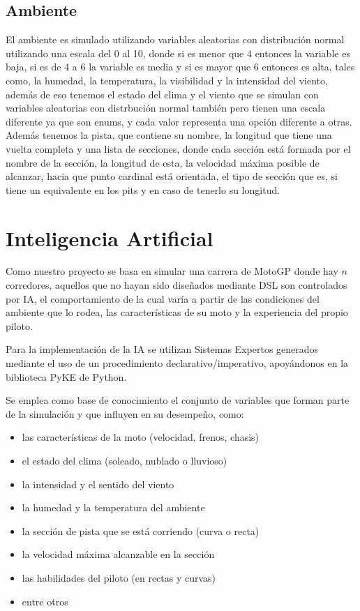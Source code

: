 \documentclass[12pt, letterpaper,spanish]{article}
\theoremstyle{definition}
\theoremstyle{remark}
\begin{document}
	\subsection{Ambiente}
		El ambiente es simulado utilizando variables aleatorias con distribución normal utilizando una escala del 0 al 10, donde si es menor que 4 entonces la variable es baja, si es de 4 a 6 la variable es media y si es mayor que 6 entonces es alta, tales como, la humedad, la temperatura, la visibilidad y la intensidad del viento, además de eso tenemos el estado del clima y el viento que se simulan con variables aleatorias con distrbución normal también pero tienen una escala diferente ya que son enums, y cada valor representa una  opción diferente a otras. Además tenemos la pista, que contiene su nombre, la longitud que tiene una vuelta completa y una lista de secciones, donde cada sección está formada por el nombre de la sección, la longitud de esta, la velocidad máxima posible de alcanzar, hacia que punto cardinal está orientada, el tipo de sección que es, si tiene un equivalente en los pits y en caso de tenerlo su longitud.  

\section{Inteligencia Artificial}\cite{conferenciasIA}\cite{russell}
	Como nuestro proyecto se basa en simular una carrera de MotoGP donde hay $n$ corredores, aquellos que no hayan sido diseñados mediante DSL son controlados por IA, el comportamiento de la cual varía a partir de las condiciones del ambiente que lo rodea, las características de su moto y la experiencia del propio piloto.
	
	Para la implementación de la IA se utilizan Sistemas Expertos generados mediante el uso de un procedimiento declarativo/imperativo, apoyándonos en la biblioteca PyKE\cite{pyke} de Python.
	
	Se emplea como base de conocimiento el conjunto de variables que forman parte de la simulación y que influyen en su desempeño, como:
	\begin{itemize}
		\item las características de la moto (velocidad, frenos, chasis)
		\item el estado del clima (soleado, nublado o lluvioso)
		\item la intensidad y el sentido del viento
		\item la humedad y la temperatura del ambiente
		\item la sección de pista que se está corriendo (curva o recta)
		\item la velocidad máxima alcanzable en la sección
		\item las habilidades del piloto (en rectas y curvas)
		\item entre otros
	\end{itemize}
	
\end{document}
